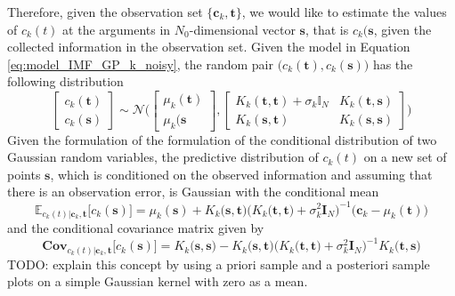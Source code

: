 Therefore, given the observation set $\big\{ \mathbf{c}_k, \mathbf{t} \big\}$, we would like to estimate the values of $c_k(t)$ at the arguments in $N_0$-dimensional vector $\mathbf{s}$, that is $c_k(\mathbf{s}$, given the collected information in the observation set. Given the model in Equation \eqref{eq:model_IMF_GP_k_noisy}, the random pair $\big(c_k(\mathbf{t}), c_k(\mathbf{s})\big)$ has the following distribution
\begin{equation}
\begin{bmatrix}
c_k(\mathbf{t})\\
c_k(\mathbf{s})
\end{bmatrix} \sim \mathcal{N}\bigg( \begin{bmatrix}
\mu_k(\mathbf{t}) \\
\mu_k(\mathbf{s}
\end{bmatrix} , \begin{bmatrix}
K_k(\mathbf{t},\mathbf{t})+ \sigma_k \mathbb{I}_N & K_k(\mathbf{t},\mathbf{s}) \\
K_k(\mathbf{s},\mathbf{t}) & K_k(\mathbf{s},\mathbf{s})
\end{bmatrix}  \bigg)
\end{equation}
Given the formulation of the formulation of the conditional distribution of two Gaussian random variables,  the predictive distribution of $c_k(t)$ on a new set of points $\mathbf{s}$, which is conditioned on the observed information and assuming that there is an observation error, is Gaussian with the conditional mean
\begin{equation*}
\mathbb{E}_{c_k(t)|\mathbf{c}_k, \mathbf{t}} \big[c_k(\mathbf{s})] = \mu_k(\mathbf{s}) +  K_k \big(\mathbf{s},\mathbf{t}\big)\Big( K_k \big(\mathbf{t},\mathbf{t}\big) + \sigma^2_k \mathbf{I}_N \Big) ^{-1} \big( \mathbf{c}_k - \mu_k(\mathbf{t})\big) 
\end{equation*}
and the conditional covariance matrix given by
\begin{equation*}
\mathbf{Cov}_{c_k(t)|\mathbf{c}_k,\mathbf{t}} \big[c_k(\mathbf{s})] = K_k \big(\mathbf{s},\mathbf{s}\big) - K_k\big(\mathbf{s},\mathbf{t}\big) \Big( K_k \big(\mathbf{t},\mathbf{t}\big) + \sigma^2_k \mathbf{I}_N \Big)^{-1} K_k \big(\mathbf{t},\mathbf{s}\big) 
\end{equation*}
TODO: explain this concept by using a priori sample and a posteriori sample plots on a simple Gaussian kernel with zero as a mean. 



